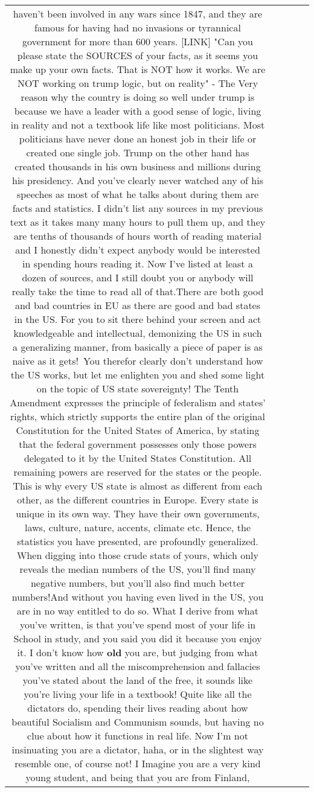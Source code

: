 \documentclass[11pt]{article}
\newlength\mylength
\begin{document}
\begin{center}
\begin{longtable}{|C{.65\mylength}|C{.30\mylength}|C{.12\mylength}|C{.12\mylength}|C{.12\mylength}|}
haven't been involved in any wars since 1847, and they are famous for having had no invasions or tyrannical government for more than 600 years.  [LINK] "Can you please state the SOURCES of your facts, as it seems you make up your own facts. That is NOT how it works. We are NOT working on trump logic, but on reality" - The Very reason why the country is doing so well under trump is because we have a leader with a good sense of logic, living in reality and not a textbook life like most politicians. Most politicians have never done an honest job in their life or created one single job. Trump on the other hand has created thousands in his own business and millions during his presidency. And you've clearly never watched any of his speeches as most of what he talks about during them are facts and statistics. I didn't list any sources in my previous text as it takes many many hours to pull them up, and they are tenths of thousands of hours worth of reading material and I honestly didn't expect anybody would be interested in spending hours reading it. Now I've listed at least a dozen of sources, and I still doubt you or anybody will really take the time to read all of that.There are both good and bad countries in EU as there are good and bad states in the US. For you to sit there behind your screen and act knowledgeable and intellectual, demonizing the US in such a generalizing manner, from basically a piece of paper is as naive as it gets! You therefor clearly don't understand how the US works, but let me enlighten you and shed some light on the topic of US state sovereignty! The Tenth Amendment expresses the principle of federalism and states' rights, which strictly supports the entire plan of the original Constitution for the United States of America, by stating that the federal government possesses only those powers delegated to it by the United States Constitution. All remaining powers are reserved for the states or the people. This is why every US state is almost as different from each other, as the different countries in Europe. Every state is unique in its own way. They have their own governments, laws, culture, nature, accents, climate etc. Hence, the statistics you have presented, are profoundly generalized. When digging into those crude stats of yours, which only reveals the median numbers of the US, you'll find many negative numbers, but you'll also find much better numbers!And without you having even lived in the US, you are in no way entitled to do so. What I derive from what you've written, is that you've spend most of your life in School in study, and you said you did it because you enjoy it. I don't know how \textbf{old} you are, but judging from what you've written and all the miscomprehension and fallacies you've stated about the land of the free, it sounds like you're living your life in a textbook! Quite like all the dictators do, spending their lives reading about how beautiful Socialism and Communism sounds, but having no clue about how it functions in real life. Now I'm not insinuating you are a dictator, haha, or in the slightest way resemble one, of course not! I Imagine you are a very kind young student, and being that you are from Finland, 
\end{longtable}
\end{center}
\end{document}
